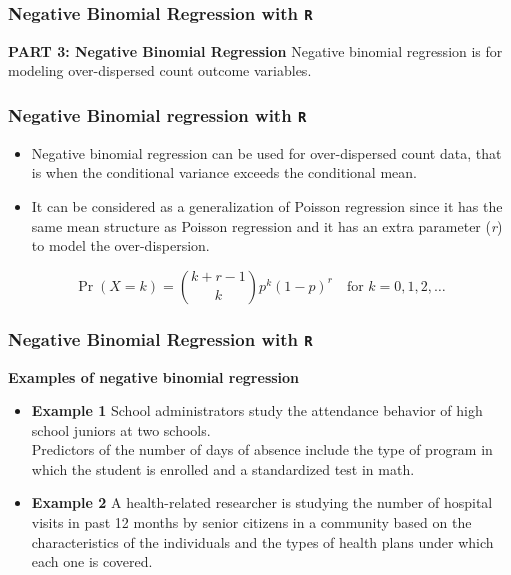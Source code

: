 \documentclass[MASTER.tex]{subfiles}
\begin{document}
\begin{frame}[fragile]
\frametitle{Negative Binomial Regression with \texttt{R}}
\LARGE
\textbf{PART 3: Negative Binomial Regression}
{
\Large
Negative binomial regression is for modeling over-dispersed count outcome variables.
}
\end{frame}
\begin{frame}[fragile]
\frametitle{Negative Binomial regression with \texttt{R}}
\large	
\begin{itemize}
		\item Negative binomial regression can be used for over-dispersed count data, that is when the conditional 
		variance exceeds the conditional mean. 
		\item It can be considered as a generalization of Poisson regression since it has the same mean structure as Poisson 	
		regression and it has an extra parameter (\textit{r}) to model the over-dispersion. 
\end{itemize}
\[\Pr(X = k) = {k+r-1 \choose k} p^k(1-p)^r \quad \mbox{for }k = 0, 1, 2, \dots \]
	
\end{frame}
\begin{frame}[fragile]
\frametitle{Negative Binomial Regression with \texttt{R} }
\large
\textbf{Examples of negative binomial regression}
\begin{itemize}
\item \textbf{Example 1}  School administrators study the attendance behavior of high school juniors at two schools. \\ Predictors of the number of days of absence include the type of program in which the student is enrolled and a standardized test in math.

\item \textbf{Example 2}  A health-related researcher is studying the number of hospital visits in past 12 months by senior citizens in a community based on the characteristics of the individuals and the types of health plans under which each one is covered.
\end{itemize}
\end{frame}
\end{document}
